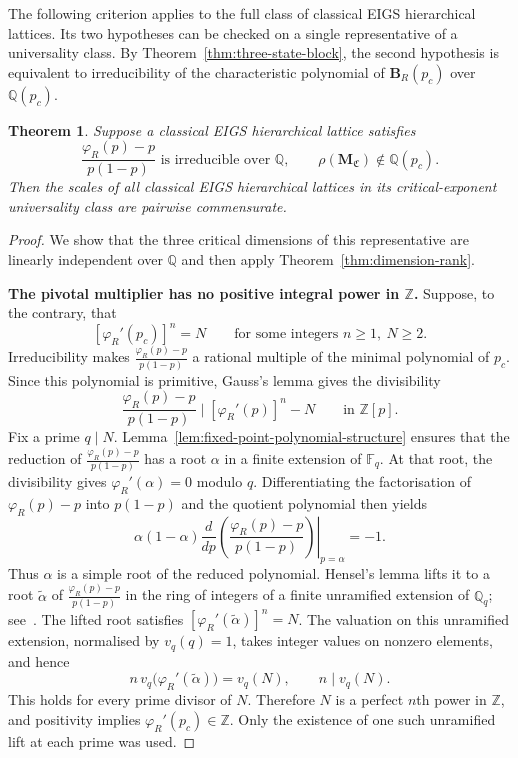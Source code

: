 \documentclass[scheme=plain,11pt]{ctexart}
\newtheorem{theorem}{Theorem}[section]
\theoremstyle{definition}
\theoremstyle{remark}
\begin{document}
The following criterion applies to the full class of classical EIGS hierarchical lattices.
Its two hypotheses can be checked on a single representative of a universality class.
By Theorem~\ref{thm:three-state-block}, the second hypothesis is equivalent to irreducibility of the characteristic polynomial of $\mathbf B_R(p_c)$ over $\mathbb Q(p_c)$.

\begin{theorem}\label{thm:irreducible-commensurability}
Suppose a classical EIGS hierarchical lattice satisfies
\[
 \frac{\varphi_R(p)-p}{p(1-p)}\text{ is irreducible over }\mathbb Q,
 \qquad
 \rho(\mathbf M_{\mathfrak C})\notin\mathbb Q(p_c).
\]
Then the scales of all classical EIGS hierarchical lattices in its critical-exponent universality class are pairwise commensurate.
\end{theorem}
\begin{proof}
We show that the three critical dimensions of this representative are linearly independent over $\mathbb Q$ and then apply Theorem~\ref{thm:dimension-rank}.

\textbf{The pivotal multiplier has no positive integral power in $\mathbb Z$.}
Suppose, to the contrary, that
\[
 [\varphi_R'(p_c)]^n=N
 \qquad\text{for some integers }n\ge1,\ N\ge2.
\]
Irreducibility makes $\frac{\varphi_R(p)-p}{p(1-p)}$ a rational multiple of the minimal polynomial of $p_c$.
Since this polynomial is primitive, Gauss's lemma gives the divisibility
\[
 \frac{\varphi_R(p)-p}{p(1-p)}\mid [\varphi_R'(p)]^n-N
 \qquad\text{in }\mathbb Z[p].
\]
Fix a prime $q\mid N$.
Lemma~\ref{lem:fixed-point-polynomial-structure} ensures that the reduction of $\frac{\varphi_R(p)-p}{p(1-p)}$ has a root $\alpha$ in a finite extension of $\mathbb F_q$.
At that root, the divisibility gives $\varphi_R'(\alpha)=0$ modulo $q$.
Differentiating the factorisation of $\varphi_R(p)-p$ into $p(1-p)$ and the quotient polynomial then yields
\[
 \alpha(1-\alpha)
 \left.\frac{d}{dp}\left(\frac{\varphi_R(p)-p}{p(1-p)}\right)\right|_{p=\alpha}=-1.
\]
Thus $\alpha$ is a simple root of the reduced polynomial.
Hensel's lemma lifts it to a root $\widetilde\alpha$ of $\frac{\varphi_R(p)-p}{p(1-p)}$ in the ring of integers of a finite unramified extension of $\mathbb Q_q$; see~\cite{milne2020ant}.
The lifted root satisfies $[\varphi_R'(\widetilde\alpha)]^n=N$.
The valuation on this unramified extension, normalised by $v_q(q)=1$, takes integer values on nonzero elements, and hence
\[
 n\,v_q\bigl(\varphi_R'(\widetilde\alpha)\bigr)=v_q(N),
 \qquad n\mid v_q(N).
\]
This holds for every prime divisor of $N$.
Therefore $N$ is a perfect $n$th power in $\mathbb Z$, and positivity implies $\varphi_R'(p_c)\in\mathbb Z$.
Only the existence of one such unramified lift at each prime was used.


\end{proof}
\end{document}
